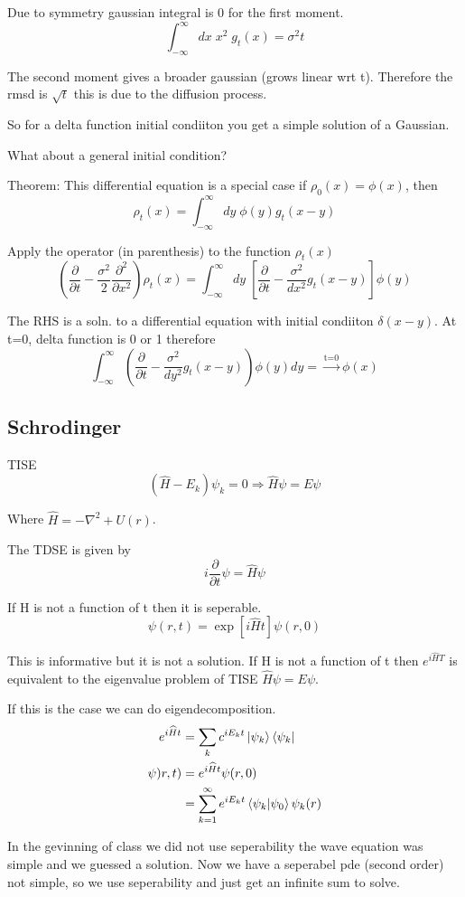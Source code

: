 \documentclass{article}
\newcommand{\be}{\begin{equation}}
\newcommand{\ee}{\end{equation}}
\newcommand{\pd}{\partial}
\newcommand{\ii}{\int_{-\infty}^\infty}
\newcommand{\prt}{\frac{\pd}{\pd t}}
\newcommand{\prxs}{\frac{\pd^2}{\pd x^2}}
\begin{document}
Due to symmetry gaussian integral is 0 for the first moment.
\be
\ii dx\; x^2\; g_t(x) = \sigma^2t
\ee

The second moment gives a broader gaussian (grows linear wrt t).
Therefore the rmsd is $\sqrt{t}$ this is due to the diffusion process.


So for a delta function initial condiiton you get a simple solution of a Gaussian.

What about a general initial condition?

Theorem:
This differential equation is a special case if $\rho_0(x)=\phi(x)$, then
\be
\rho_t(x) = \ii dy\; \phi(y)g_t(x-y)
\ee

Apply the operator (in parenthesis) to the function $\rho_t(x)$
\be
\left(\prt - \frac{\sigma^2}{2} \prxs \right)\rho_t(x) = \ii dy\;\left[\prt - \frac{\sigma^2}{dx^2}g_t(x-y) \right] \phi(y)
\ee

The RHS is a soln. to a differential equation with initial condiiton $\delta(x-y)$.
At t=0, delta function is 0 or 1 therefore
\be
\ii \left( \prt - \frac{\sigma^2}{dy^2} g_t(x-y) \right)\phi(y)dy= \xrightarrow{\text{t=0}} \phi(x)
\ee

\subsection{Schrodinger}
TISE
\be
\left(\widehat{H} - E_k \right) \psi_k =0 \Rightarrow \widehat{H}\psi = E\psi
\ee

Where $\widehat{H} = -\nabla^2 + U(r)$.

The TDSE is given by
\be
i \prt \psi = \widehat{H}\psi
\ee

If H is not a function of t then it is seperable.
\be
\psi(r,t) = \exp\left[i\widehat{H}t\right]\psi(r,0)
\ee

This is informative but it is not a solution.
If H is not a function of t then $e^{i\widehat{H}T}$ is equivalent to the
eigenvalue problem of TISE $\widehat{H}\psi = E\psi$.

If this is the case we can do eigendecomposition.
\be
\begin{split}
e^{i\widehat{H}t} &= \sum_k c^{iE_kt}\ket{\psi_k}\bra{\psi_k}\\
\psi)r,t) &= e^{i\widehat{H}t}\psi(r,0)\\
&= \sum_{k=1}^\infty e^{iE_kt}\braket{\psi_k|\psi_0}\psi_k(r)
\end{split}
\ee

In the gevinning of class we did not use seperability the wave equation was simple and we guessed a solution.
Now we have a seperabel pde (second order) not simple, so we use seperability and just get an infinite sum to solve. 
\end{document}
